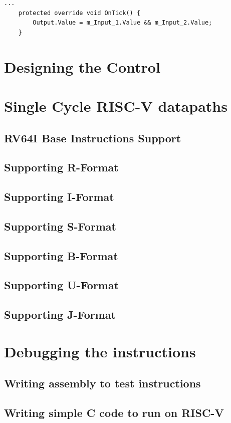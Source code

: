         \begin{minipage}{\linewidth}
            \begin{lstlisting}[language={[Sharp]C}, caption={A slice of the \texttt{AND gate} process SME code. It simply calculates the logical AND of two input and outputs the result.},captionpos=b, label = AND]
...
    protected override void OnTick() {
        Output.Value = m_Input_1.Value && m_Input_2.Value;
    }
            \end{lstlisting}
        \end{minipage} 
        
    
\section{Designing the Control}
    
\section{Single Cycle RISC-V datapaths}

    \subsection{RV64I Base Instructions Support}

    \subsection{Supporting R-Format}
    
    \subsection{Supporting I-Format}
    
    \subsection{Supporting S-Format}
    
    \subsection{Supporting B-Format}
    
    \subsection{Supporting U-Format}
    
    \subsection{Supporting J-Format}
    
\section{Debugging the instructions}

    \subsection{Writing assembly to test instructions}
    
    \subsection{Writing simple C code to run on RISC-V}
    
    
    

    